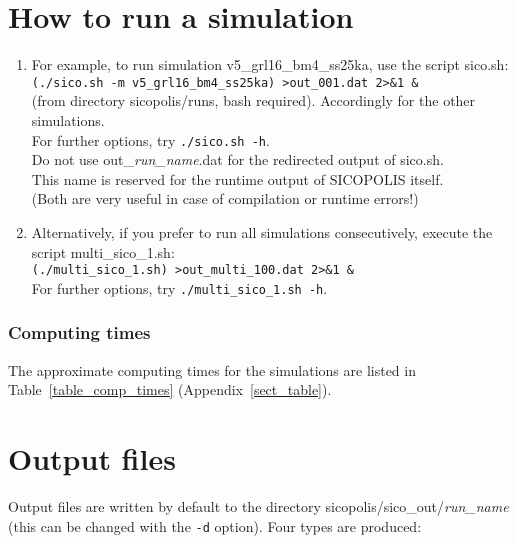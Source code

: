 \documentclass[12pt,a4paper]{article}
\begin{document}

\section{How to run a simulation}

\begin{enumerate}

\item For example, to run simulation v5\_grl16\_bm4\_ss25ka, use the script sico.sh:
\\
\hspace*{10mm}\verb+(./sico.sh -m v5_grl16_bm4_ss25ka) >out_001.dat 2>&1 &+
\\
(from directory sicopolis/runs, bash required). Accordingly for the other simulations.
\\
For further options, try \verb+./sico.sh -h+.
\\
\warning{} Do not use out\_\emph{run\_name}.dat for the redirected output of sico.sh. 
\\
\phantom{\warning{}} This name is reserved for the runtime output of SICOPOLIS itself.
\\
 (Both are very useful in case of compilation or runtime errors!)

\item Alternatively, if you prefer to run all simulations consecutively, execute the script multi\_sico\_1.sh:
\\
\hspace*{10mm}\verb+(./multi_sico_1.sh) >out_multi_100.dat 2>&1 &+
\\
For further options, try \verb+./multi_sico_1.sh -h+.

\end{enumerate}

\subsubsection*{Computing times}

The approximate computing times for the simulations are listed in Table~\ref{table_comp_times} (Appendix~\ref{sect_table}).

\section{Output files}
\label{sect_output}

Output files are written by default to the directory sicopolis/sico\_out/\emph{run\_name} (this can be changed with the \verb+-d+ option). Four types are produced:
\end{document}

